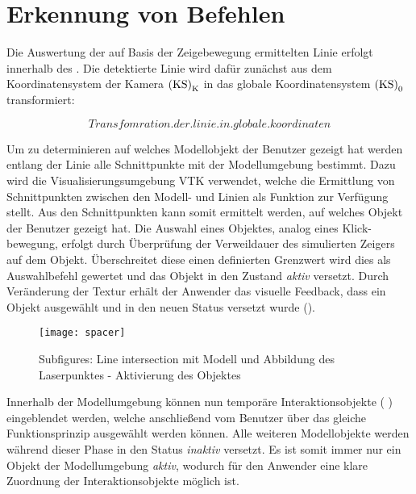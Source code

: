 \section{Erkennung von Befehlen}
Die Auswertung der auf Basis der Zeigebewegung ermittelten Linie erfolgt innerhalb des \red[\mVisualization]. Die detektierte Linie wird dafür zunächst aus dem Koordinatensystem der Kamera ${\mathrm{(KS)}}_{\mathrm{K}}$ in das globale Koordinatensystem ${\mathrm{(KS)}}_{\mathrm{0}}$ transformiert:

\begin{equation}
Transfomration.der.linie.in.globale.koordinaten
\end{equation}

Um zu determinieren auf welches Modellobjekt der Benutzer gezeigt hat werden entlang der Linie alle Schnittpunkte mit der Modellumgebung bestimmt. Dazu wird die Visualisierungsumgebung VTK verwendet, welche die Ermittlung von Schnittpunkten zwischen den Modell- und Linien als Funktion zur Verfügung stellt. Aus den Schnittpunkten kann somit ermittelt werden, auf welches Objekt der Benutzer gezeigt hat. Die Auswahl eines Objektes, analog eines \glqq Klick\grqq -bewegung, erfolgt durch Überprüfung der Verweildauer des simulierten Zeigers auf dem Objekt. Überschreitet diese einen definierten Grenzwert wird dies als Auswahlbefehl gewertet und das Objekt in den Zustand \textit{aktiv} versetzt. Durch Veränderung der Textur erhält der Anwender das visuelle Feedback, dass ein Objekt ausgewählt und in den neuen Status versetzt wurde ().\\

\begin{figure}[!ht]
	\begin{center}
		\texttt{[image: spacer]}
		\caption{Subfigures: Line intersection mit Modell und Abbildung des Laserpunktes - Aktivierung des Objektes}
		\label{fig.intintersect}
	\end{center}
\end{figure} 

Innerhalb der Modellumgebung können nun temporäre Interaktionsobjekte ( \red[(a)]) eingeblendet werden, welche anschließend vom Benutzer über das gleiche Funktionsprinzip ausgewählt werden können. Alle weiteren Modellobjekte werden während dieser Phase in den Status \textit{inaktiv} versetzt. Es ist somit immer nur ein Objekt der Modellumgebung \textit{aktiv}, wodurch für den Anwender eine klare Zuordnung der Interaktionsobjekte möglich ist.

